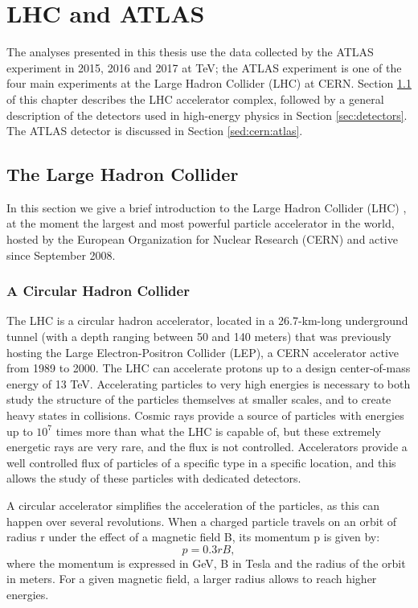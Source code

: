 \chapter{LHC and ATLAS}
\label{chap:cern}

The analyses presented in this thesis use the data collected by the ATLAS experiment in 2015, 2016 and 2017 at \cmtre TeV; the ATLAS experiment is one of the four main experiments at the Large Hadron Collider (LHC) at CERN. Section \ref{sed:cern:lhc} of this chapter describes the LHC accelerator complex, followed by a general description of the detectors used in high-energy physics in Section \ref{sec:detectors}. The ATLAS detector is discussed in Section \ref{sed:cern:atlas}.


\section{The Large Hadron Collider}
\label{sed:cern:lhc}

In this section we give a brief introduction to the Large Hadron Collider (LHC) \cite{1748-0221-3-08-S08001}, at the moment the largest and most powerful particle accelerator in the world, hosted by the European Organization for Nuclear Research (CERN) and active since September 2008.


\subsection{A Circular Hadron Collider}

The LHC is a circular hadron accelerator, located in a 26.7-km-long underground tunnel (with a depth ranging between 50 and 140 meters) that was previously hosting the Large Electron-Positron Collider (LEP), a CERN accelerator active from 1989 to 2000. The LHC can accelerate protons up to a design center-of-mass energy of 13 TeV. Accelerating particles to very high energies is necessary to both study the structure of the particles themselves at smaller scales, and to create heavy states in collisions. Cosmic rays provide a source of particles with energies up to $10^7$ times more than what the LHC is capable of, but these extremely energetic rays are very rare, and the flux is not controlled. Accelerators provide a well controlled flux of particles of a specific type in a specific location, and this allows the study of these particles with dedicated detectors.

A circular accelerator simplifies the acceleration of the particles, as this can happen over several revolutions. When a charged particle travels on an orbit of radius r under the effect of a magnetic field B, its momentum p is given by:
\begin{equation}
\label{eq:cern:p03br}
p = 0.3 r B,
\end{equation}
\noindent where the momentum is expressed in GeV, B in Tesla and the radius of the orbit in meters. For a given magnetic field, a larger radius allows to reach higher energies. 

